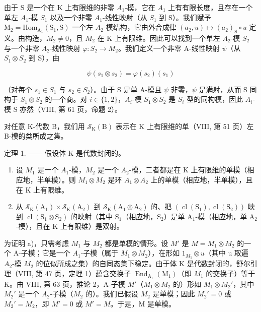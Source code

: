 由于 S 是一个在 K 上有限维的非零 \(A_{1}\)-模，它在 \(A_{1}\) 上有有限长度，且存在一个单左 \(A_{1}\)-模 \(S_{1}\) 以及一个非零 \(A_{1}\)-线性映射（从 \(S_{1}\) 到 S）。我们赋予 \(\mathrm{M}_{2} = \mathrm{Hom}_{\mathrm{A}_{1}}(\mathrm{S}_{1}, \mathrm{S})\) 一个左 \(A_{2}\)-模结构，它由外合成律 \((a_{2}, u) \mapsto (a_{2})_{\mathrm{S}} \circ u\) 定义。由构造，\(M_{2} \neq 0\)，且 \(M_{2}\) 在 K 上有限维。因此可以找到一个单左 \(A_{2}\)-模 \(S_{2}\) 与一个非零 \(A_{2}\)-线性映射 \(\varphi : S_{2} \to M_{2}\)。我们定义一个非零 A-线性映射 \(\psi\)（从 \(S_{1} \otimes S_{2}\) 到 S），由

\[
\psi (s _ {1} \otimes s _ {2}) = \varphi (s _ {2}) (s _ {1})\tag{1}
\]

（对每个 \(s_{1} \in S_{1}\) 与 \(s_{2} \in S_{2}\)）。由于 S 是单 A-模且 \(\psi\) 非零，\(\psi\) 是满射，从而 S 同构于 \(S_{1} \otimes S_{2}\) 的一个商。对 \(i \in \{1, 2\}\)，\(A_{i}\)-模 \(S_{1} \otimes S_{2}\) 是 \(S_{i}\) 型的同构模，因此 \(A_{i}\)-模 S 亦然（VIII, 第 61 页，命题 2）。

对任意 K-代数 B，我们用 \(\mathcal{S}_{\mathrm{K}}(\mathrm{B})\) 表示在 K 上有限维的单（VIII, 第 51 页）左 B-模的类所成之集。

定理 1. —— 假设体 K 是代数封闭的。

\begin{enumerate}
\def\labelenumi{\alph{enumi})}
\item
  设 \(M_{1}\) 是一个 \(A_{1}\)-模，\(M_{2}\) 是一个 \(A_{2}\)-模，二者都是在 K 上有限维的单模（相应地，半单模）。则 \(M_{1} \otimes M_{2}\) 是环 \(A_{1} \otimes A_{2}\) 上的单模（相应地，半单模），且在 K 上有限维。
\item
  从 \(\mathcal{S}_{\mathrm{K}}(\mathrm{A}_1)\times \mathcal{S}_{\mathrm{K}}(\mathrm{A}_2)\) 到 \(\mathcal{S}_{\mathrm{K}}(\mathrm{A}_1\otimes \mathrm{A}_2)\) 的、把 \((\operatorname {cl}(\mathrm{S}_1),\operatorname {cl}(\mathrm{S}_2))\) 映到 \(\operatorname {cl}(\mathrm{S}_1\otimes \mathrm{S}_2)\) 的映射（其中 \(\mathrm{S}_1\)（相应地，\(\mathrm{S}_2\)）是单 \(\mathrm{A}_1\)-模（相应地，单 \(\mathrm{A}_2\)-模），且在 \(\mathrm{K}\) 上有限维）是双射。
\end{enumerate}

为证明 a)，只需考虑 \(M_{1}\) 与 \(M_{2}\) 都是单模的情形。设 \(M'\) 是 \(M = M_{1} \otimes M_{2}\) 的一个 A-子模；它是一个 \(A_{1}\)-子模（属于 \(M_{1} \otimes M_{2}\)），在形如 \(1_{M_{1}} \otimes u\)（其中 u 取遍 \(A_{2}\)-模 \(M_{2}\) 的位似所成之集）的自同态集下稳定。由于体 K 是代数封闭的，舒尔引理（VIII, 第 47 页，定理 1）蕴含交换子 \(\operatorname{End}_{\mathrm{A}_{1}}(\mathrm{M}_{1})\)（即 \(M_{1}\) 的交换子）等于 K。由 VIII, 第 63 页，推论 2，A-子模 \(M'\)（\(M_{1} \otimes M_{2}\) 的）形如 \(M_{1} \otimes M_{2}'\)，其中 \(M_{2}'\) 是一个 \(A_{2}\)-子模（\(M_{2}\) 的）。我们已假设 \(M_{2}\) 是单模；因此 \(M_{2}' = 0\) 或 \(M_{2}' = M_{2}\)，即 \(M' = 0\) 或 \(M' = M\)。于是，M 是单模。

